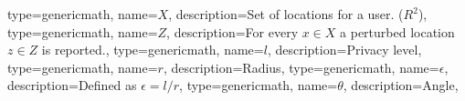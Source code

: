 
{
  type=genericmath,
  name={$\ensuremath{X} $},
  description={Set of locations for a user. ($R^2$)},
}
{
  type=genericmath,
  name={$\ensuremath{Z} $},
  description={For every $x \in X$ a perturbed location $z \in Z$ is reported.},
}
{
  type=genericmath,
  name={$\ensuremath{l} $},
  description={Privacy level},
}
{
  type=genericmath,
  name={$\ensuremath{r} $},
  description={Radius},
}
{
  type=genericmath,
  name={$\ensuremath{\epsilon} $},
  description={Defined as $\epsilon = l/r$},
}
{
  type=genericmath,
  name={$\ensuremath{\theta} $},
  description={Angle},
}